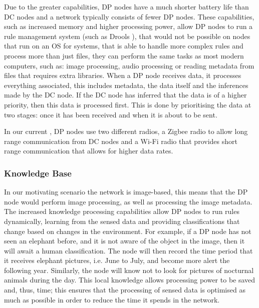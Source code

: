 	Due to the greater capabilities, DP nodes have a much shorter battery life than DC nodes and a network typically consists of fewer DP nodes. These capabilities, such as increased memory and higher processing power, allow DP nodes to run a rule management system (such as Drools \cite{proctor2005drools}), that would not be possible on nodes that run on an OS for \DIFdelbegin {}\DIFdelend \DIFaddbegin {}\DIFaddend systems, that is able to handle more complex rules and process more than just files, they can perform the same tasks as most modern computers, such as: image processing, audio processing or reading metadata from files that requires extra libraries. When a DP node receives data, it processes everything associated, this includes metadata, the data itself and the inferences made by the DC node. If the DC node has inferred that the data is of a higher priority, then this data is processed first. This is done by prioritising the data at two stages: once it has been received and when it is about to be sent.

	In our current \DIFdelbegin {}\DIFdelend \DIFaddbegin {}\DIFaddend , DP nodes use two different radios, a Zigbee radio to allow long range communication from DC nodes and a Wi-Fi radio that provides short range communication that allows for higher data rates.

	\subsubsection{Knowledge Base}
	In our motivating scenario the network is image-based, this means that the DP node would perform image processing, as well as processing the image metadata. The increased knowledge processing capabilities allow DP nodes to run rules dynamically, learning from the sensed data and providing classifications that change based on changes in the environment. For example, if a DP node has not seen an elephant before, and it is not aware of the object in the image, then it will await a human classification. The node will then record the time period that it receives elephant pictures, i.e. June to July, and become more alert the following year. Similarly, the node will know not to look for pictures of nocturnal animals during the day. This local knowledge allows processing power to be saved and, thus, time; this ensures that the processing of sensed data is optimised as much as possible in order to reduce the time it spends in the network.

